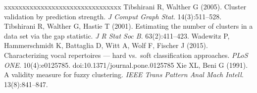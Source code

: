 \begin{thebibliography}{xxxxxxxxxxxxxxxxxxxxxxxxxxxxxxxx}
 Tibshirani R, Walther G (2005). Cluster validation by prediction strength. \emph{J Comput Graph Stat}. 14(3):511--528.
 Tibshirani R, Walther G, Hastie T (2001). Estimating the number of clusters in a data set via the gap statistic. \emph{J R Stat Soc B}. 63(2):411--423.
 Wadewitz P, Hammerschmidt K, Battaglia D, Witt A, Wolf F, Fischer J (2015). Characterizing vocal repertoires --- hard vs.\ soft classification approaches. \emph{PLoS ONE}. 10(4):e0125785. doi:10.1371/journal.pone.0125785
 Xie XL, Beni G (1991). A validity measure for fuzzy clustering. \emph{IEEE Trans Pattern Anal Mach Intell}. 13(8):841--847.
\end{thebibliography}
